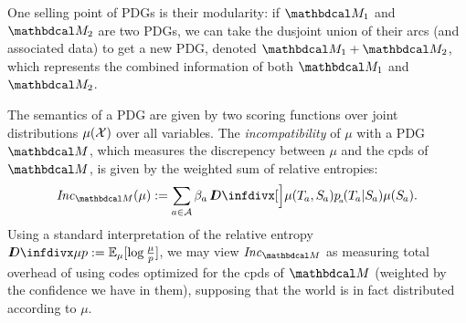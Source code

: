 \documentclass[twoside]{article}
\begin{document}
One selling point of PDGs is their modularity: if $\dg M_1$ and $\dg M_2$ are two PDGs, we can take the dusjoint union of their arcs (and associated data) to get a new PDG, denoted $\dg M_1 + \dg M_2$,
which represents the combined information of both $\dg M_1$ and $\dg M_2$.



The semantics of a PDG are given by two scoring functions over joint distributions $\mu(\mathcal X)$ over all variables.
The \emph{incompatibility} of $\mu$ with a PDG $\dg M$, which
measures the discrepency between $\mu$ and the cpds of $\dg M$,
is given by the weighted sum of relative entropies:
\begin{align*}
    \Inc_{\dg M}(\mu) :=
        \sum_{a \in \Ar} \beta_a\, \kldiv[\Big]{\mu(\Tgt a,\Src a)}{p\ssub a(\Tgt a | \Src a) \mu(\Src a)}.
\end{align*}
Using a standard interpretation of the relative entropy $\kldiv{\mu}{p} := \Ex_{\mu}[\log \frac\mu p]$, we may view $\Inc_{\dg M}$ as measuring total overhead of using codes optimized for the cpds of $\dg M$ (weighted by the confidence we have in them), supposing that the world is in fact distributed according to $\mu$.
\end{document}

